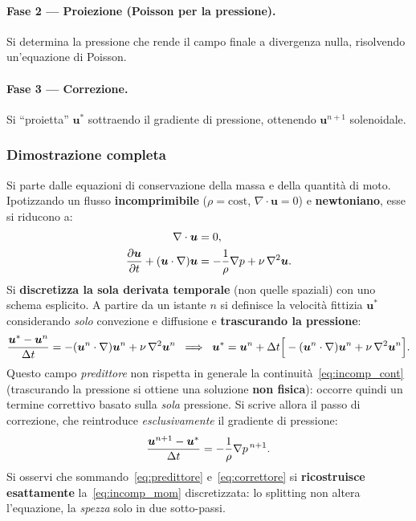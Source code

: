 \paragraph{Fase 2 --- Proiezione (Poisson per la pressione).} Si determina la pressione
che rende il campo finale a divergenza nulla, risolvendo un'equazione di Poisson.

\paragraph{Fase 3 --- Correzione.} Si ``proietta'' $\bm u^*$ sottraendo il gradiente di
pressione, ottenendo $\bm u^{n+1}$ solenoidale.

\subsubsection*{Dimostrazione completa}

Si parte dalle equazioni di conservazione della massa e della quantità di moto.
Ipotizzando un flusso \textbf{incomprimibile} ($\rho=\text{cost}$,
$\nabla\cdot\bm u=0$) e \textbf{newtoniano}, esse si riducono a:
\begin{align}
  \nabla\cdot\bm u &= 0, \label{eq:incomp_cont}\\
  \dfrac{\partial \bm u}{\partial t} + (\bm u\cdot\nabla)\bm u
  &= -\frac{1}{\rho}\nabla p + \nu\,\nabla^2\bm u . \label{eq:incomp_mom}
\end{align}
Si \textbf{discretizza la sola derivata temporale} (non quelle spaziali) con uno schema
esplicito. A partire da un istante $n$ si definisce la velocità fittizia $\bm u^*$
considerando \emph{solo} convezione e diffusione e \textbf{trascurando la pressione}:
\begin{equation}
  \frac{\bm u^{*}-\bm u^{n}}{\Delta t}
  = -(\bm u^{n}\cdot\nabla)\bm u^{n} + \nu\,\nabla^2\bm u^{n}
  \;\;\Longrightarrow\;\;
  \bm u^{*} = \bm u^{n} + \Delta t\Big[-(\bm u^{n}\cdot\nabla)\bm u^{n}
  + \nu\,\nabla^2\bm u^{n}\Big].
  \label{eq:predittore}
\end{equation}
Questo campo \emph{predittore} non rispetta in generale la
continuità~\eqref{eq:incomp_cont} (trascurando la pressione si ottiene una soluzione
\textbf{non fisica}): occorre quindi un termine correttivo basato sulla \emph{sola}
pressione. Si scrive allora il passo di correzione, che reintroduce \emph{esclusivamente}
il gradiente di pressione:
\begin{equation}
  \frac{\bm u^{n+1}-\bm u^{*}}{\Delta t} = -\frac{1}{\rho}\nabla p^{\,n+1}.
  \label{eq:correttore}
\end{equation}
Si osservi che sommando~\eqref{eq:predittore} e~\eqref{eq:correttore} si \textbf{ricostruisce
esattamente} la~\eqref{eq:incomp_mom} discretizzata: lo splitting non altera l'equazione,
la \emph{spezza} solo in due sotto-passi.

